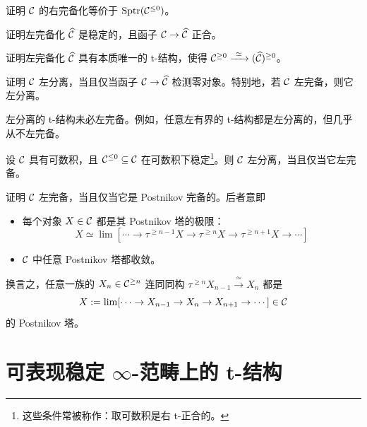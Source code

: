 \begin{exercise}\label{L16-3.6}
证明 $\mathcal{C}$ 的右完备化等价于 $\mathrm{Sptr}(\mathcal{C}^{\le0})$。
\end{exercise}

\begin{exercise}\label{L16-3.7}
证明左完备化 $\widehat{\mathcal{C}}$ 是稳定的，且函子 $\mathcal{C}\to\widehat{\mathcal{C}}$ 正合。
\end{exercise}

\begin{exercise}\label{L16-3.8}
证明左完备化 $\widehat{\mathcal{C}}$ 具有本质唯一的 t-结构，使得 $\cC^{\ge0}\xrightarrow{\ \simeq\ }(\widehat{\cC})^{\ge0}$。
\end{exercise}

\begin{exercise}\label{L16-3.9}
证明 $\mathcal{C}$ 左分离，当且仅当函子 $\mathcal{C}\to\widehat{\mathcal{C}}$ 检测零对象。特别地，若 $\mathcal{C}$ 左完备，则它左分离。
\end{exercise}

\begin{warning}\label{L16-3.10}
左分离的 t-结构未必左完备。例如，任意左有界的 t-结构都是左分离的，但几乎从不左完备。
\end{warning}

\begin{exercise}\label{L16-3.11}
设 $\mathcal{C}$ 具有可数积，且 $\mathcal{C}^{\le0}\subseteq\mathcal{C}$ 在可数积下稳定\footnote{这些条件常被称作：取可数积是右 t-正合的。}。则 $\mathcal{C}$ 左分离，当且仅当它左完备。
\end{exercise}

\begin{exercise}\label{L16-3.12}
证明 $\mathcal{C}$ 左完备，当且仅当它是 Postnikov 完备的。后者意即
\begin{itemize}[leftmargin=2.2em,itemsep=0.1em]
\item 每个对象 $X\in\mathcal{C}$ 都是其 Postnikov 塔的极限：
\[
X\simeq\lim[\cdots\to\tau^{\ge n-1}X\to\tau^{\ge n}X\to\tau^{\ge n+1}X\to\cdots]
\]
\item $\mathcal{C}$ 中任意 Postnikov 塔都收敛。
\end{itemize}
换言之，任意一族的 $X_n\in\mathcal{C}^{\ge n}$ 连同同构 $\tau^{\ge n}X_{n-1}\xrightarrow{\ \simeq\ }X_n$ 都是
\[
X:=\lim[\cdots\to X_{n-1}\to X_n\to X_{n+1}\to\cdots]\in\mathcal{C}
\]
的 Postnikov 塔。
\end{exercise}

\section{可表现稳定 $\infty$-范畴上的 t-结构}

